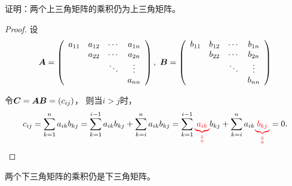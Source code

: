 \begin{frame}

\begin{li}
  证明：两个上三角矩阵的乘积仍为上三角矩阵。
\end{li} \pause 
\begin{proof}
  设
  $$
  \boldsymbol{A} = \left(
    \begin{array}{cccc}
      a_{11} & a_{12} & \cdots & a_{1n} \\
             & a_{22} & \cdots & a_{2n} \\
             &       & \ddots & \vdots   \\
             &       &     & a_{nn}
    \end{array}
  \right), ~     \boldsymbol{B} = \left(
    \begin{array}{cccc}
      b_{11} & b_{12} & \cdots & b_{1n} \\
             & b_{22} & \cdots & b_{2n} \\
             &       & \ddots & \vdots   \\
             &       &     & b_{nn}
    \end{array}
  \right)
  $$
  
  令$\boldsymbol{C} = \boldsymbol{A}\boldsymbol{B} = (c_{ij})$，
  则当$i>j$时，
  $$
  c_{ij} = \sum_{k=1}^n a_{ik}b_{kj}   
  = \sum_{k=1}^{i-1} a_{ik}b_{kj}  + \sum_{k=i}^n a_{ik}b_{kj}  
  = \sum_{k=1}^{i-1} \textcolor{red}{\underbrace{a_{ik}}_{\Downarrow\atop0}}b_{kj}  
  + \sum_{k=i}^n a_{ik}\textcolor{red}{\underbrace{b_{kj}}_{\Downarrow\atop0}}  = 0.
  $$
\end{proof}
\end{frame}

\begin{frame}

\begin{zhu}
  两个下三角矩阵的乘积仍是下三角矩阵。
\end{zhu}
\end{frame}

